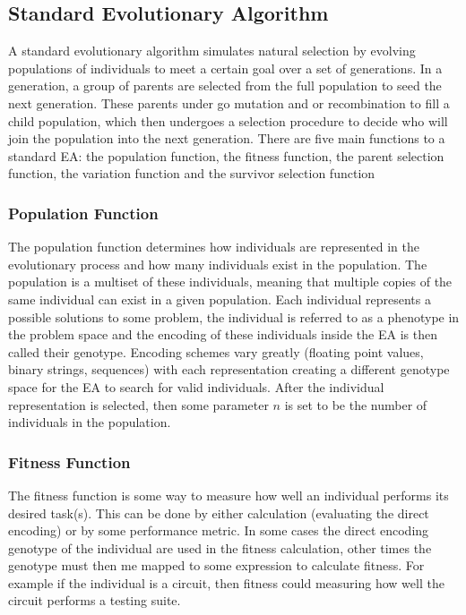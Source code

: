 \documentclass[conference]{IEEEtran}
\begin{document}
{\subsection{Standard Evolutionary Algorithm}
\label{ea:standard_ea}
\par A standard evolutionary algorithm simulates natural selection by evolving populations of individuals to meet a certain goal over a set of generations. 
In a generation, a group of parents are selected from the full population to seed the next generation.
These parents under go mutation and or recombination to fill a child population, which then undergoes a selection procedure to decide who will join the population into the next generation. 
There are five main functions to a standard EA: the population function, the fitness function, the parent selection function, the variation function and the survivor selection function

\subsubsection{Population Function}
\label{ea:population_function}
\par The population function determines how individuals are represented in the evolutionary process and how many individuals exist in the population. 
The population is a multiset of these individuals, meaning that multiple copies of the same individual can exist in a given population. 
Each individual represents a possible solutions to some problem, the individual is referred to as a phenotype in the problem space and the encoding of these individuals inside the EA is then called their genotype.
Encoding schemes vary greatly (floating point values, binary strings, sequences) with each representation creating a different genotype space for the EA to search for valid individuals.
After the individual representation is selected, then some parameter $n$ is set to be the number of individuals in the population. 

\subsubsection{Fitness Function}
\label{ea:fitness_function}
\par The fitness function is some way to measure how well an individual performs its desired task(s). 
This can be done by either calculation (evaluating the direct encoding) or by some performance metric.
In some cases the direct encoding genotype of the individual are used in the fitness calculation, other times the genotype must then me mapped to some expression to calculate fitness.
For example if the individual is a circuit, then fitness could measuring how well the circuit performs a testing suite.

}
\end{document}
